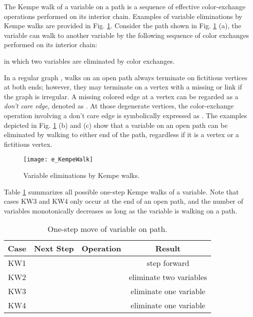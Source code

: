 \documentclass[11pt]{article}
\begin{document}
The Kempe walk of a  variable on a  path is a sequence of effective color-exchange operations performed on its interior chain. Examples of variable eliminations by Kempe walks are provided in Fig. \ref{fig:KempeWalk}. Consider the  path  shown in Fig. \ref{fig:KempeWalk} (a), the variable  can walk to another variable  by the following sequence of color exchanges performed on its interior chain:

in which two variables are eliminated by color exchanges.

In a regular graph , walks on an open  path always terminate on fictitious vertices at both ends; however, they may terminate on a vertex  with a missing  or  link if the graph  is irregular. A missing colored edge at a vertex can be regarded as a {\it don't care edge}, denoted as . At those degenerate vertices, the color-exchange operation involving a don't care edge is symbolically expressed as . The examples depicted in Fig. \ref{fig:KempeWalk} (b) and (c) show that a  variable on an open  path can be eliminated by walking to either end of the path, regardless if it is a vertex or a fictitious vertex.

\begin{figure}[t]
	\centering
	\texttt{[image: e\_KempeWalk]}
	\caption{Variable eliminations by Kempe walks.}
	\label{fig:KempeWalk}
\end{figure}

Table \ref{tab:KempeWalkcase} summarizes all possible one-step Kempe walks of a  variable. Note that cases KW3 and KW4 only occur at the end of an open  path, and the number of variables  monotonically decreases as long as the  variable is walking on a  path.

\begin{table}[htbp]
	\centering
	{\footnotesize
		\begin{tabular}{|c |c| c| c| }
			\hline 
			Case & Next Step & Operation & Result \\
			\hline \hline
			KW1 &  & &step forward\\ \hline 
			KW2 &  & & eliminate two variables \\ \hline 
			KW3 &  & & eliminate one variable \\ \hline 
			KW4 &  & & eliminate one variable \\
			\hline		
		\end{tabular}	
		}
	\caption{One-step move of  variable on  path.}
	\label{tab:KempeWalkcase}
\end{table}
\end{document}

